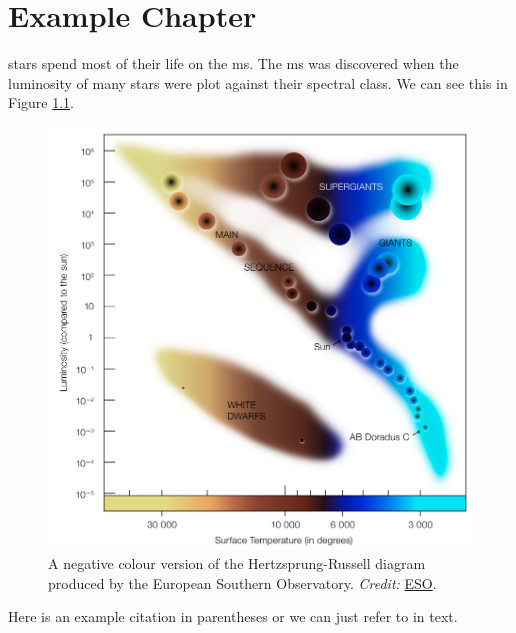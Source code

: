 \chapter{Example Chapter}

\Glspl{star} spend most of their life on the \acrfull{ms}. The \acrshort{ms} was discovered when the \gls{luminosity} of many stars were plot against their spectral class. We can see this in Figure \ref{fig:example}. 

\begin{figure}[t]
  \centering
  \includegraphics{figures/example.pdf}
  \caption[Short version of caption]{A negative colour version of the Hertzsprung-Russell diagram produced by the European Southern Observatory. \emph{Credit:} \href{https://www.eso.org/public/images/eso0728c/}{ESO}.}
  \label{fig:example}
\end{figure}

Here is an example citation in parentheses \citep{einstein} or we can just refer to \citet{dirac} in text.

\lipsum[17-18]
